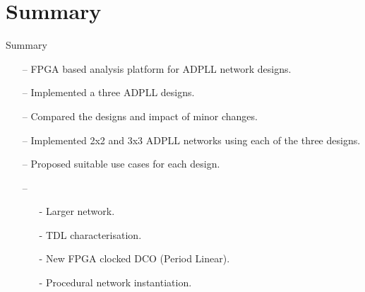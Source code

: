\documentclass{beamer}
\begin{document}
\section*{Summary}

\begin{frame}{Summary}

    \begin{itemize}
        \item[--]
            FPGA based analysis platform for ADPLL network designs.
        \item[--]
            Implemented a three ADPLL designs.
        \item[--]
            Compared the designs and impact of minor changes.
        \item[--]
            Implemented 2x2 and 3x3 ADPLL networks using each of the three designs.
        \item[--]
            Proposed suitable use cases for each design.
        \item[--]
        \begin{itemize}
            \textbf{Future Work}:
            \item[-]
            	Larger network.
            \item[-]
            	TDL characterisation.
            \item[-]
            	New FPGA clocked DCO (Period Linear).
           	\item[-]
            	Procedural network instantiation.
        \end{itemize}
    \end{itemize}

\end{frame}
\end{document}
